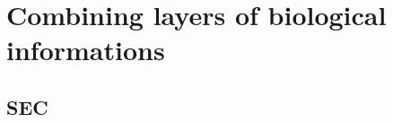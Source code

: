 
\chapter{Combining layers of biological informations} %

\label{ch:02-04} %


\section{SEC}

\blindtext